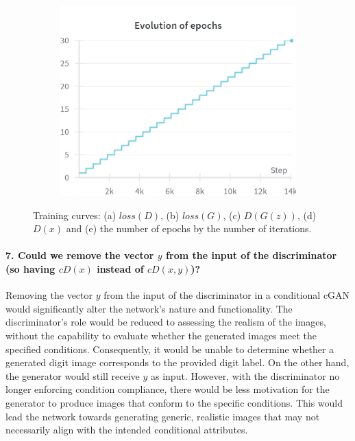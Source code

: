 \begin{figure}[H]
    \begin{subfigure}{0.45\textwidth}
        \centering
        \includegraphics[width=0.95\linewidth]{cDCGAN/epochs.png}
        \caption{}
        \label{subfig:cDCGAN/epochs}
    \end{subfigure}%

    \caption{Training curves: (a) $loss(D)$, (b) $loss(G)$, (c) $D(G(z))$, (d) $D(x)$ and (e) the number of epochs by the number of iterations.}
    \label{fig:cDCGAN_curves}
\end{figure}

\paragraph*{7. Could we remove the vector $y$ from the input of the discriminator (so having $cD(x)$ instead of $cD(x, y)$)?}

Removing the vector $y$ from the input of the discriminator in a conditional cGAN would significantly alter the network's nature and functionality. The discriminator's role would be reduced to assessing the realism of the images, without the capability to evaluate whether the generated images meet the specified conditions. Consequently, it would be unable to determine whether a generated digit image corresponds to the provided digit label. On the other hand, the generator would still receive $y$ as input. However, with the discriminator no longer enforcing condition compliance, there would be less motivation for the generator to produce images that conform to the specific conditions. This would lead the network towards generating generic, realistic images that may not necessarily align with the intended conditional attributes.

